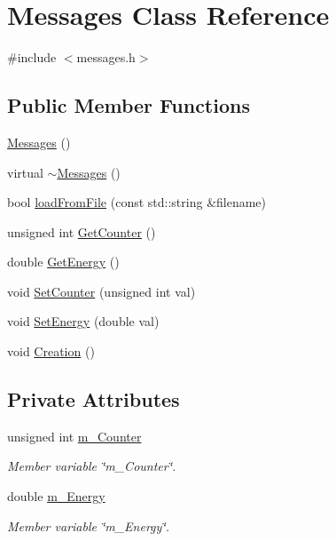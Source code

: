 \hypertarget{classMessages}{}\section{Messages Class Reference}
\label{classMessages}


{\ttfamily \#include $<$messages.\+h$>$}

\subsection*{Public Member Functions}
\begin{DoxyCompactItemize}
\item 
\mbox{\hyperlink{classMessages_abd3013dea54bfd87550739c3fa6e20d5}{Messages}} ()
\item 
virtual \mbox{\hyperlink{classMessages_ab0060ed5667e5dd2d47811df6c42d462}{$\sim$\+Messages}} ()
\item 
bool \mbox{\hyperlink{classMessages_a4263549c3f5c27b68279adbd7bcbcc30}{load\+From\+File}} (const std\+::string \&filename)
\item 
unsigned int \mbox{\hyperlink{classMessages_a256f8190d9ef6e25db6a5030f9805b5d}{Get\+Counter}} ()
\item 
double \mbox{\hyperlink{classMessages_ab33cb49f408b16cf1fa29b5f141921c4}{Get\+Energy}} ()
\item 
void \mbox{\hyperlink{classMessages_aecaad70bba58fd8d1a5640cb04088a2c}{Set\+Counter}} (unsigned int val)
\item 
void \mbox{\hyperlink{classMessages_a522996f78812e3a01e68214385db2cfd}{Set\+Energy}} (double val)
\item 
void \mbox{\hyperlink{classMessages_ac575287a8c19833d30480c5fb1769dfa}{Creation}} ()
\end{DoxyCompactItemize}
\subsection*{Private Attributes}
\begin{DoxyCompactItemize}
\item 
unsigned int \mbox{\hyperlink{classMessages_a43ed87c9f9c3ed6dee41b1e420eaf30f}{m\+\_\+\+Counter}}
\begin{DoxyCompactList}\small\item\em Member variable \char`\"{}m\+\_\+\+Counter\char`\"{}. \end{DoxyCompactList}\item 
double \mbox{\hyperlink{classMessages_afd1431daeff8d60f5856b36144b49f87}{m\+\_\+\+Energy}}
\begin{DoxyCompactList}\small\item\em Member variable \char`\"{}m\+\_\+\+Energy\char`\"{}. \end{DoxyCompactList}\end{DoxyCompactItemize}


